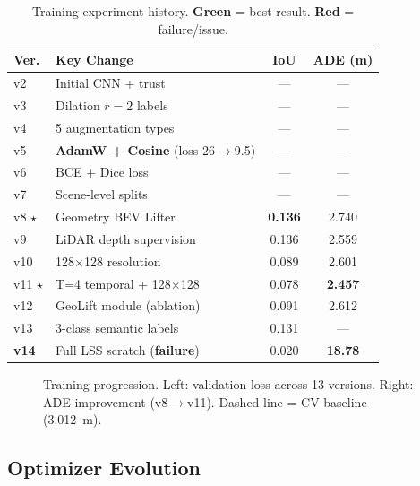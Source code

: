 \documentclass[10pt,twocolumn]{article}
\newcommand{\best}[1]{\textbf{\color{mygreen}#1}}
\newcommand{\warn}[1]{\textbf{\color{myred}#1}}
\begin{document}
\begin{table}[h]
\centering
\caption{Training experiment history. \best{Green} = best result.
\warn{Red} = failure/issue.}
\label{tab:versions}
\scriptsize
\setlength{\tabcolsep}{4pt}
\begin{tabular}{@{}llcc@{}}
\toprule
\textbf{Ver.} & \textbf{Key Change} & \textbf{IoU} & \textbf{ADE (m)} \\
\midrule
v2 & Initial CNN + trust & --- & --- \\
v3 & Dilation $r=2$ labels & --- & --- \\
v4 & 5 augmentation types & --- & --- \\
v5 & \textbf{AdamW + Cosine} (loss 26$\to$9.5) & --- & --- \\
v6 & BCE + Dice loss & --- & --- \\
v7 & Scene-level splits & --- & --- \\
\rowcolor{mygray}
v8 $\star$ & Geometry BEV Lifter & \best{0.136} & 2.740 \\
v9 & LiDAR depth supervision & 0.136 & 2.559 \\
v10 & 128$\times$128 resolution & 0.089 & 2.601 \\
\rowcolor{mygray}
v11 $\star$ & T=4 temporal + 128$\times$128 & 0.078 & \best{2.457} \\
v12 & GeoLift module (ablation) & 0.091 & 2.612 \\
v13 & 3-class semantic labels & 0.131 & --- \\
\warn{v14} & Full LSS scratch (\warn{failure}) & 0.020 & \warn{18.78} \\
\bottomrule
\end{tabular}
\end{table}

\begin{figure}[h]
\centering
{}
\caption{Training progression. Left: validation loss across 13 versions.
Right: ADE improvement (v8$\to$v11). Dashed line = CV baseline (3.012~m).}
\label{fig:training}
\end{figure}

\subsection{Optimizer Evolution}
\end{document}
